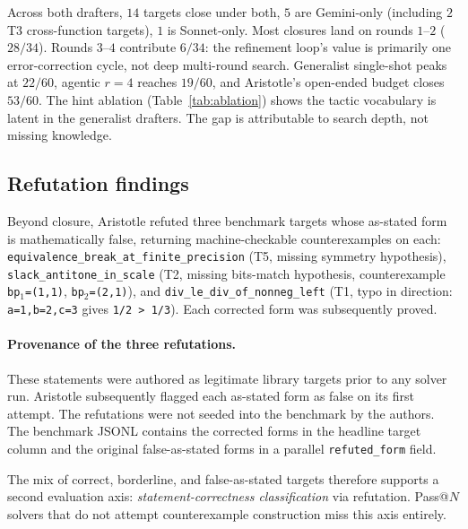 Across both drafters, $14$ targets close under both, $5$ are
Gemini-only (including $2$ T3 cross-function targets), $1$ is
Sonnet-only. Most closures land on rounds $1$--$2$ ($28/34$).
Rounds $3$--$4$ contribute $6/34$: the refinement loop's value is
primarily one error-correction cycle, not deep multi-round search.
Generalist single-shot peaks at $22/60$, agentic $r{=}4$
reaches $19/60$, and Aristotle's open-ended budget closes $53/60$.
The hint ablation (Table~\ref{tab:ablation}) shows the
tactic vocabulary is latent in the generalist drafters. The gap
is attributable to search depth, not missing knowledge.

\subsection{Refutation findings}
\label{sec:aristotle-refute}

Beyond closure, Aristotle refuted three benchmark targets whose
as-stated form is mathematically false, returning machine-checkable
counterexamples on each: \texttt{equivalence\_\allowbreak break\_at\_\allowbreak finite\_precision}
(T5, missing symmetry hypothesis), \texttt{slack\_antitone\_in\_scale}
(T2, missing bits-match hypothesis, counterexample
\texttt{bp$_1$=(1,1)}, \texttt{bp$_2$=(2,1)}), and
\texttt{div\_le\_div\_of\_nonneg\_left} (T1, typo in direction:
\texttt{a=1,b=2,c=3} gives \texttt{1/2 > 1/3}). Each corrected form
was subsequently proved.

\paragraph{Provenance of the three refutations.}
These statements were authored as legitimate library targets prior
to any solver run. Aristotle subsequently flagged each as-stated
form as false on its first attempt. The refutations were not
seeded into the benchmark by the authors. The benchmark JSONL
contains the corrected forms in the headline target column and the
original false-as-stated forms in a parallel \texttt{refuted\_form}
field.

The mix of correct, borderline, and false-as-stated targets
therefore supports a second evaluation axis: \emph{statement-correctness
classification} via refutation. Pass@$N$ solvers that do not
attempt counterexample construction miss this axis entirely.
